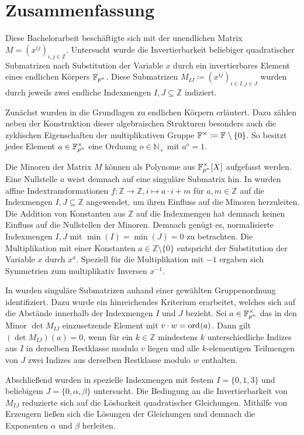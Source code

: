 \section{Zusammenfassung}

Diese Bachelorarbeit beschäftigte sich mit der unendlichen Matrix $M = \left( x^{ij} \right)_{i,j \in \mathbb{Z}}$. Untersucht wurde die Invertierbarkeit beliebiger quadratischer Submatrizen nach Substitution der Variable $x$ durch ein invertierbares Element eines endlichen Körpers $\field{p}[n]$. Diese Submatrizen $M_{IJ} \coloneqq \left( x^{ij} \right)_{i \in I,j \in J}$ wurden durch jeweils zwei endliche Indexmengen $I,J \subseteq \mathbb{Z}$ indiziert. 

Zunächst wurden in  die Grundlagen zu endlichen Körpern erläutert. Dazu zählen neben der Konstruktion dieser algebraischen Strukturen besonders auch die zyklischen Eigenschaften der multiplikativen Gruppe $\field{}^\times \coloneqq \field{} \setminus \{0\}$. So besitzt jedes Element $a \in \field{p}[n]^\times$ eine Ordnung $o \in \mathbb{N}_+$ mit $a^o = 1$.

Die Minoren der Matrix $M$ können als Polynome aus $\field{p}[n]^\times [X]$ aufgefasst werden. Eine Nullstelle $a$ weist demnach auf eine singuläre Submatrix hin. In  wurden affine Indextransformationen $f:\mathbb{Z} \rightarrow \mathbb{Z}, i \mapsto a\cdot i + m$ für $a,m \in \mathbb{Z}$ auf die Indexmengen $I,J \subseteq \mathbb{Z}$ angewendet, um ihren Einfluss auf die Minoren herzuleiten. Die Addition von Konstanten aus $\mathbb{Z}$ auf die Indexmengen hat demnach keinen Einfluss auf die Nullstellen der Minoren. Demnach genügt es, normalisierte Indexmengen $I,J$ mit $\min(I) = \min(J) = 0$ zu betrachten. Die Multiplikation mit einer Konstanten $a \in \mathbb{Z}\setminus\{0\}$ entspricht der Substitution der Variable $x$ durch $x^a$. Speziell für die Multiplikation mit $-1$ ergaben sich Symmetrien zum multiplikativ Inversen $x^{-1}$.

In  wurden singuläre Submatrizen anhand einer gewählten Gruppenordnung identifiziert. Dazu wurde ein hinreichendes Kriterium erarbeitet, welches sich auf die Abstände innerhalb der Indexmengen $I$ und $J$ bezieht. Sei $a\in \field{p}[n]^\times$ das in den Minor $\det M_{IJ}$ einzusetzende Element mit $v\cdot w = \ord{a}$. Dann gilt $(\det M_{IJ})(a) = 0$, wenn für ein $k\in \mathbb{Z}$ mindestens $k$ unterschiedliche Indizes aus $I$ in derselben Restklasse modulo $v$ liegen und alle $k$-elementigen Teilmengen von $J$ zwei Indizes aus derselben Restklasse modulo $w$ enthalten.

Abschließend wurden in  spezielle Indexmengen mit festem $I = \{0,1,3\}$ und beliebigem $J = \{0,\alpha,\beta\}$ untersucht. Die Bedingung an die Invertierbarkeit von $M_{IJ}$ reduzierte sich auf die Lösbarkeit quadratischer Gleichungen. Mithilfe von Erzeugern ließen sich die Lösungen der Gleichungen und demnach die Exponenten $\alpha$ und $\beta$ herleiten.